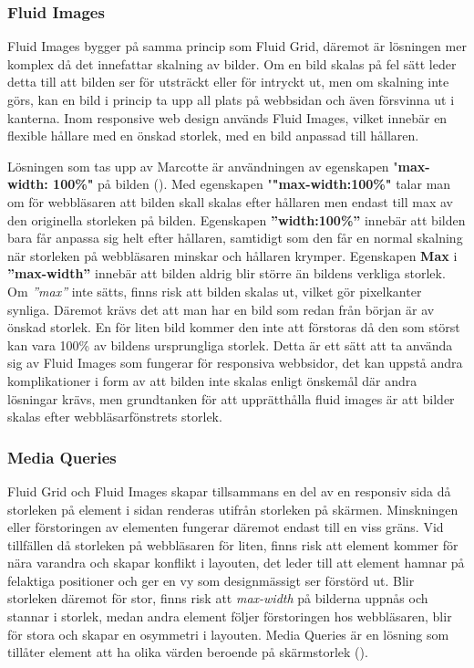 \documentclass[11pt]{article}
\begin{document}
\subsubsection{Fluid Images}
Fluid Images bygger på samma princip som Fluid Grid, däremot är lösningen mer komplex då det innefattar skalning av bilder. Om en bild skalas på fel sätt leder detta till att bilden ser för utsträckt eller för intryckt ut, men om skalning inte görs, kan en bild i princip ta upp all plats på webbsidan och även försvinna ut i kanterna. Inom responsive web design används Fluid Images, vilket innebär en flexible hållare med en önskad storlek, med en bild anpassad till hållaren.  

Lösningen som tas upp av Marcotte är användningen av egenskapen "\textbf{max-width: 100\%"} på bilden (\cite[s. 45]{resp}). Med egenskapen "\textbf{"max-width:100\%"}  talar man om för webbläsaren att bilden skall skalas efter hållaren men endast till max av den originella storleken på bilden. Egenskapen \textbf{”width:100\%”} innebär att bilden bara får anpassa sig helt efter hållaren, samtidigt som den får en normal skalning när storleken på webbläsaren minskar och hållaren krymper. Egenskapen \textbf{Max} i \textbf{”max-width”} innebär att bilden aldrig blir större än bildens verkliga storlek. Om \textit{”max”} inte sätts, finns risk att bilden skalas ut, vilket gör pixelkanter synliga. Däremot krävs det att man har en bild som redan från början är av önskad storlek. En för liten bild kommer den inte att förstoras då den som störst kan vara 100\% av bildens ursprungliga storlek. Detta är ett sätt att ta använda sig av Fluid Images som fungerar för responsiva webbsidor, det kan uppstå andra komplikationer i form av att bilden inte skalas enligt önskemål där andra lösningar krävs, men grundtanken för att upprätthålla fluid images är att bilder skalas efter webbläsarfönstrets storlek.

\subsubsection{Media Queries}
Fluid Grid och Fluid Images skapar tillsammans en del av en responsiv sida då storleken på element i sidan renderas utifrån storleken på skärmen. Minskningen eller förstoringen av elementen fungerar däremot endast till en viss gräns. Vid tillfällen då storleken på webbläsaren för liten, finns risk att element kommer för nära varandra och skapar konflikt i layouten, det leder till att element hamnar på felaktiga positioner och ger en vy som designmässigt ser förstörd ut. Blir storleken däremot för stor, finns risk att \textit{max-width} på bilderna uppnås och stannar i storlek, medan andra element följer förstoringen hos webbläsaren, blir för stora och skapar en osymmetri i layouten. Media Queries är en lösning som tillåter element att ha olika värden beroende på skärmstorlek (\cite[s. 65]{resp}).
\end{document}
